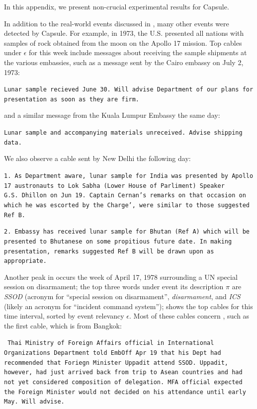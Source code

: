 
In this appendix, we present non-crucial experimental results for Capsule.


In addition to the real-world events discussed in , many other events were detected by Capsule.  For example, in 1973, the U.S. presented all nations with samples of rock obtained from the moon on the Apollo 17 mission.  Top cables under $\epsilon$ for this week include messages about receiving the sample shipments at the various embassies, such as a message sent by the Cairo embassy on July 2, 1973:
\begin{shaded*} \tt{Lunar sample recieved June 30.  Will advise Department of our plans for presentation as soon as they are firm.}
\end{shaded*}
\noindent and a similar message from the Kuala Lumpur Embassy the same day:
\begin{shaded*} \tt{Lunar sample and accompanying materials unreceived. Advise shipping data.}
\end{shaded*}
\noindent We also observe a cable sent by New Delhi the following day:
\begin{shaded*} \tt{1. As Department aware, lunar sample for India was presented by Apollo 17 austronauts to Lok Sabha (Lower House of Parliment) Speaker G.S.~Dhillon on Jun 19.
Captain Cernan's remarks on that occasion on which he was escorted by the Charge',
were similar to those suggested Ref B.}

\tt{2. Embassy has received lunar sample for Bhutan (Ref A) which will be presented to Bhutanese on some propitious future date.
In making presentation, remarks suggested Ref B will be drawn upon as appropriate.}
\end{shaded*}


Another peak in  occurs the week of April 17, 1978 surrounding a UN special session on disarmament; the top three words under event its description $\pi$ are \emph{SSOD} (acronym for ``special session on disarmament'', \emph{disarmament}, and \emph{ICS} (likely an acronym for ``incident command system'');  shows the top cables for this time interval, sorted by event relevancy $\epsilon$.  Most of these cables concern , such as the first cable, which is from Bangkok:
\begin{shaded*} \tt{
Thai Ministry of Foreign Affairs official in International Organizations Department told EmbOff Apr 19 that his Dept had recommended that Foriegn Minister Uppadit attend SSOD. 
Uppadit, however, had just arrived back from trip to Asean
countries and had not yet considered composition of delegation.
MFA official expected the Foreign Minister would not decided
on his attendance until early May. Will advise.}
\end{shaded*}

